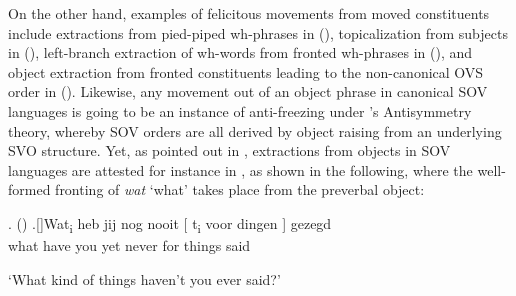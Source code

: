 \par
On the other hand, examples of felicitous movements from moved constituents include extractions from pied-piped wh-phrases in  (\citealt{Torrego1985}), topicalization from subjects in  (\citealt{Abels2007}), left-branch extraction of wh-words from fronted wh-phrases in  (\citealt{Wiland2010}), and object extraction from fronted constituents leading to the non-canonical OVS order in  (\citealt{Wiland2016}). Likewise, any movement out of an object phrase in canonical SOV languages is going to be an instance of anti-freezing under \citeauthor{Kayne1994}'s \citeyear{Kayne1994} Antisymmetry theory, whereby SOV orders are all derived by object raising from an underlying SVO structure. Yet, as pointed out in \cite{Corver2017}, extractions from objects in SOV languages are attested for instance in , as shown in the following, where the well-formed fronting of \textit{wat} `what' takes place from the preverbal object:

\ex.  (\citealt[26]{Corver2017})
\ag.[]\hspace{-22pt}Wat\textsubscript{i} heb jij nog nooit {[ t\textsubscript{i}} voor {dingen ]} gezegd\\
\hspace{-22pt}what have you yet never {} for {things} said\\
\hspace{-22pt}\strut `What kind of things haven't you ever said?'
 
